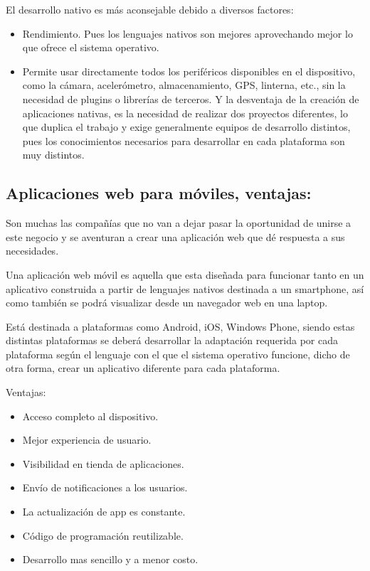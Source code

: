 \documentclass[conference,compsoc,onecolumn]{IEEEtran}
\begin{document}
El desarrollo nativo es más aconsejable debido a diversos factores:\\

\begin{itemize}
    \item Rendimiento. Pues los lenguajes nativos son mejores aprovechando mejor lo que ofrece el sistema operativo.
    \item Permite usar directamente todos los periféricos disponibles en el dispositivo, como la cámara, acelerómetro, almacenamiento, GPS, linterna, etc., sin la necesidad de plugins o librerías de terceros.
    Y la desventaja de la creación de aplicaciones nativas, es la necesidad de realizar dos proyectos diferentes, lo que duplica el trabajo y exige generalmente equipos de desarrollo distintos, pues los conocimientos necesarios para desarrollar en cada plataforma son muy distintos. 
    
\end{itemize}



\subsection{Aplicaciones web para móviles, ventajas:}




 Son muchas las compañías que no van a dejar pasar la oportunidad de unirse a este negocio y se aventuran a crear una aplicación web que dé respuesta a sus necesidades.\newline

Una aplicación web móvil es aquella que esta diseñada para funcionar tanto en un aplicativo construida a partir de lenguajes nativos destinada a un smartphone, así como también se podrá visualizar desde un navegador web en una laptop.\newline

Está destinada a plataformas como Android, iOS, Windows Phone, siendo estas distintas plataformas se deberá desarrollar la adaptación requerida por cada plataforma según el lenguaje con el que el sistema operativo funcione, dicho de otra forma, crear un aplicativo diferente para cada plataforma.\newline

Ventajas:\\

\begin{itemize}
    \item Acceso completo al dispositivo.
    \item Mejor experiencia de usuario.
    \item Visibilidad en tienda de aplicaciones.
    \item Envío de notificaciones a los usuarios.
    \item La actualización de app es constante.
    \item Código de programación reutilizable.
    \item Desarrollo mas sencillo y a menor costo.
\end{itemize}
\end{document}
